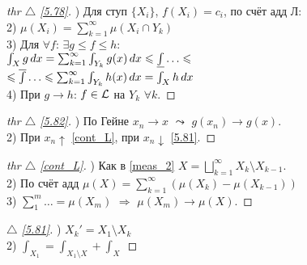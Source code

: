 
\begin{minipage}[t]{0.45\textwidth}
\begin{proof}[
{thr} $\triangle$
\eqref{5.78}]

\phantom{42}

) Для ступ $\{X_i\}$, $f(X_i)=c_i$, по счёт адд Л: \\
2) $\mu(X_i) = \sum_{k=1}^{\infty} \mu(X_i \cap Y_k)$ \\
3) Для $\forall f$: $\exists g \leq f \leq h$: \\
$\int_X g \d x = \sum_{k=1}^{\infty}\int_{Y_k} g(x) \d x \leq 
\underline{\int} \dots  \leq$\\
$\leq \overline{\int} \dots \leq \sum_{k=1}^{\infty} \int_{Y_k} h(x) \d x = \int_X h \d x $\\
4) При $g \to h$: $f \in \mathcal{L}$ на $Y_k$ $\forall k$.
\end{proof}

\begin{proof}[
{thr} $\triangle$
\eqref{5.82}]

\phantom{42}

) По Гейне $x_n \to x$ $\leadsto$ $g(x_n) \to g(x)$.\\
2) При $x_n \uparrow$ \eqref{cont_L}, при $x_n \downarrow$ \eqref{5.81}.
\end{proof}
\end{minipage}
\hfill
\begin{minipage}[t]{0.55\textwidth}
\begin{proof}[
{thr} $\triangle$
\eqref{cont_L}]

\phantom{42}

) Как в \eqref{meas_2} $X = \bigsqcup_{k=1}^{\infty} X_k \setminus X_{k-1}$. \\
2) По счёт адд $\mu(X) = \sum_{k=1}^{\infty}(\mu(X_k) - \mu(X_{k-1}))$ \\
3) $\sum_1^{m} \dots = \mu(X_m)$ $\Rightarrow$ $\mu(X_m) \to \mu(X)$.
\end{proof}

\begin{proof}[
 $\triangle$
\eqref{5.81}]

\phantom{42}

) $X_k' = X_1 \setminus X_k$ \\
2) $\int_{X_1} = \int_{X_1 \setminus X} + \int_X$
\end{proof}
\end{minipage}

